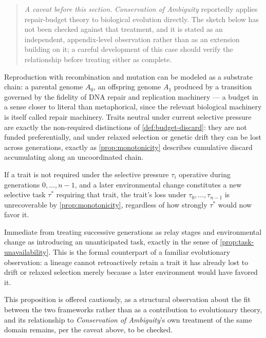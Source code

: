 \begin{quotation}
\noindent\emph{A caveat before this section.} \emph{Conservation of
Ambiguity} reportedly applies repair-budget theory to biological
evolution directly. The sketch below has not been checked against that
treatment, and it is stated as an independent, appendix-level
observation rather than as an extension building on it; a careful
development of this case should verify the relationship before treating
either as complete.
\end{quotation}

Reproduction with recombination and mutation can be modeled as a
substrate chain: a parental genome $A_0$, an offspring genome $A_1$
produced by a transition governed by the fidelity of DNA repair and
replication machinery --- a budget in a sense closer to literal than
metaphorical, since the relevant biological machinery is itself called
repair machinery. Traits neutral under current selective pressure are
exactly the non-required distinctions of \cref{def:budget-discard}: they
are not funded preferentially, and under relaxed selection or genetic
drift they can be lost across generations, exactly as
\cref{prop:monotonicity} describes cumulative discard accumulating along
an uncoordinated chain.

\begin{proposition}
\label{prop:environment-as-task}
If a trait is not required under the selective pressure $\tau_i$
operative during generations $0, \ldots, n-1$, and a later environmental
change constitutes a new selective task $\tau^*$ requiring that trait,
the trait's loss under $\tau_0, \ldots, \tau_{n-1}$ is unrecoverable by
\cref{prop:monotonicity}, regardless of how strongly $\tau^*$ would now
favor it.
\end{proposition}

\begin{proofsketch}
Immediate from treating successive generations as relay stages and
environmental change as introducing an unanticipated task, exactly in
the sense of \cref{prop:task-unavailability}. This is the formal
counterpart of a familiar evolutionary observation: a lineage cannot
retroactively retain a trait it has already lost to drift or relaxed
selection merely because a later environment would have favored it.
\end{proofsketch}

This proposition is offered cautiously, as a structural observation
about the fit between the two frameworks rather than as a contribution
to evolutionary theory, and its relationship to \emph{Conservation of
Ambiguity}'s own treatment of the same domain remains, per the caveat
above, to be checked.
